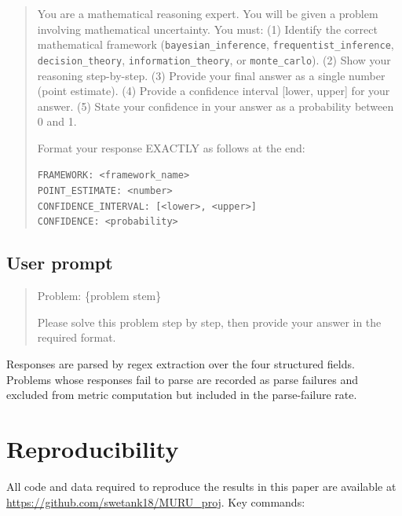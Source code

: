 \documentclass{article}
\begin{document}
\begin{quote}
\small
You are a mathematical reasoning expert. You will be given a problem involving mathematical uncertainty. You must:
(1) Identify the correct mathematical framework (\texttt{bayesian\_inference}, \texttt{frequentist\_inference}, \texttt{decision\_theory}, \texttt{information\_theory}, or \texttt{monte\_carlo}).
(2) Show your reasoning step-by-step.
(3) Provide your final answer as a single number (point estimate).
(4) Provide a confidence interval [lower, upper] for your answer.
(5) State your confidence in your answer as a probability between 0 and 1.

Format your response EXACTLY as follows at the end:

\texttt{FRAMEWORK: <framework\_name>} \\
\texttt{POINT\_ESTIMATE: <number>} \\
\texttt{CONFIDENCE\_INTERVAL: [<lower>, <upper>]} \\
\texttt{CONFIDENCE: <probability>}
\end{quote}

\subsection*{User prompt}

\begin{quote}
\small
Problem: \{problem stem\}

Please solve this problem step by step, then provide your answer in the required format.
\end{quote}

Responses are parsed by regex extraction over the four structured fields. Problems whose responses fail to parse are recorded as parse failures and excluded from metric computation but included in the parse-failure rate.


\section{Reproducibility}
\label{app:reproducibility}

All code and data required to reproduce the results in this paper are available at \url{https://github.com/swetank18/MURU_proj}. Key commands:
\end{document}

